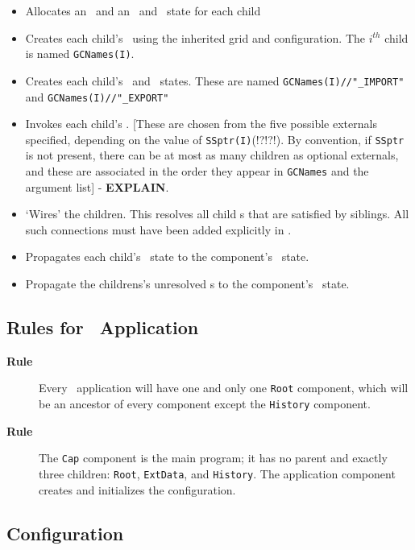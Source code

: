 \begin{itemize}
\item
  Allocates an \egc\  and an \im\ and \ex\ state for each child
\item
  Creates each child's \egc\ using the inherited grid and
  configuration. The $i^{th}$ child is named {\tt GCNames(I)}.
\item
  Creates each child's \im\ and \ex\ states. These are named
  {\tt GCNames(I)//"\_IMPORT"} and {\tt GCNames(I)//"\_EXPORT"}
\item
  Invokes each child's \ssv. [These are chosen from the five possible
    externals specified, depending on the value of {\tt SSptr(I)}(!?!?!). By
    convention, if {\tt SSptr} is not present, there can be at most as many
    children as optional externals, and these are associated in the order
    they appear in {\tt GCNames} and the argument list] - \textbf{EXPLAIN}.
\item
  `Wires' the children. This resolves all child \im s that are satisfied
  by siblings. All such connections must have been added explicitly
  in \ssv.
\item
  Propagates each child's \ex\ state to the component's \ex\ state.
\item
  Propagate the childrens's unresolved \im s to the component's \im\ state. 
\end{itemize}

\subsection{Rules for \ggn\ Application}

\begin{description}
\item[{\bf Rule \thegenct}] Every \ggn\ application will have one and only
  one \texttt{Root} component, which will be an ancestor of every
  component except the \texttt{History} component.
\addtocounter{genct}{1}

\item[{\bf Rule \thegenct}] The \texttt{Cap} component is the
  main program; it has no parent and exactly three children: \texttt{Root}, \texttt{ExtData},
  and \texttt{History}. The application component creates and
  initializes the configuration.
\addtocounter{genct}{1}
\end{description}


\subsection{Configuration}  \label{sec:Configuration}

